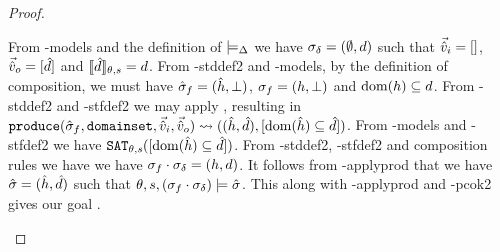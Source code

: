 \begin{proof}
\pfcase{$\delta = \domainset$}

\begin{hypvlist}
 From \hyp{models} and the definition of $\models_{\Delta}$ we have $\sigma_\delta=(\emptyset,d)$ such that $\vec{\hat{v}}_i=[]$, $\vec{\hat{v}}_o=[\hat{d}]$ and $\llbracket\hat{d}\rrbracket_{\theta,s}=d$.%
 From \hyp{stddef2} and \hyp{models}, by the definition of composition, we must have $\hat{\sigma}_f=(\hat{h},\bot)$, $\sigma_f=(h,\bot)$ and $\operatorname{dom}(h)\subseteq d$.
 From \hyp{stddef2} and \hyp{stfdef2} we may apply , resulting in $\\\texttt{produce}(\hat{\sigma}_f,\texttt{domainset},\vec{\hat{v}}_i,\vec{\hat{v}}_o)\rightsquigarrow ((\hat{h}, \hat{d}), [\operatorname{dom}(\hat{h})\subseteq \hat{d}])$.
 From \hyp{models} and \hyp{stfdef2} we have $\texttt{SAT}_{\mathit{\theta,s}}([\operatorname{dom}(\hat{h})\subseteq \hat{d}])$.
 From \hyp{stddef2}, \hyp{stfdef2} and composition rules we have we have $\sigma_f\cdot\sigma_\delta=(h,d)$. It follows from \hyp{applyprod} that we have $\hat{\sigma}=(\hat{h},\hat{d})$ such that $\theta,s,(\sigma_f\cdot\sigma_\delta)\models\hat{\sigma}$. This along with \hyp{applyprod} and \hyp{pcok2} gives our goal .
\end{hypvlist}

\end{proof}

